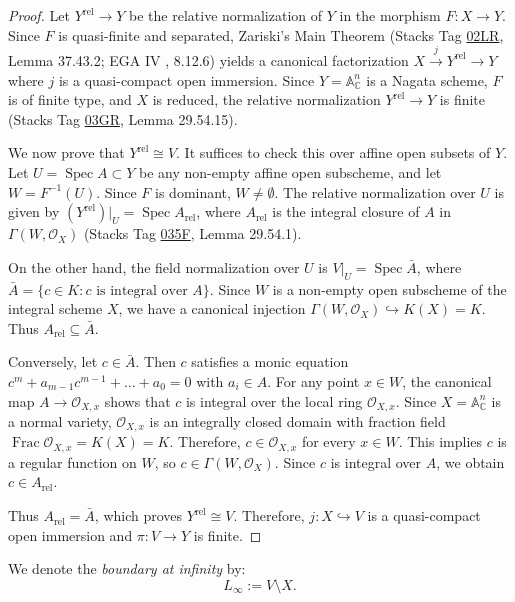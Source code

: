 \documentclass[11pt,reqno]{amsart}
\theoremstyle{plain}
\theoremstyle{definition}
\numberwithin{equation}{section}
\DeclareMathOperator{\Spec}{Spec}
\DeclareMathOperator{\Frac}{Frac}
\newcommand{\A}{\mathbb{A}}
\newcommand{\C}{\mathbb{C}}
\newcommand{\cO}{\mathcal{O}}
\begin{document}
\begin{proof}
Let $Y^{\mathrm{rel}} \to Y$ be the relative normalization of $Y$ in the morphism $F: X \to Y$. Since $F$ is quasi-finite and separated, Zariski's Main Theorem (Stacks Tag \href{https://stacks.math.columbia.edu/tag/02LR}{02LR}, Lemma 37.43.2; EGA IV \cite{EGA4}, 8.12.6) yields a canonical factorization $X \xrightarrow{j} Y^{\mathrm{rel}} \to Y$ where $j$ is a quasi-compact open immersion. Since $Y = \A^n_\C$ is a Nagata scheme, $F$ is of finite type, and $X$ is reduced, the relative normalization $Y^{\mathrm{rel}} \to Y$ is finite (Stacks Tag \href{https://stacks.math.columbia.edu/tag/03GR}{03GR}, Lemma 29.54.15).

We now prove that $Y^{\mathrm{rel}} \cong V$. It suffices to check this over affine open subsets of $Y$.
Let $U = \Spec A \subset Y$ be any non-empty affine open subscheme, and let $W = F^{-1}(U)$. Since $F$ is dominant, $W \neq \emptyset$.
The relative normalization over $U$ is given by $(Y^{\mathrm{rel}})|_U = \Spec A_{\mathrm{rel}}$, where $A_{\mathrm{rel}}$ is the integral closure of $A$ in $\Gamma(W, \cO_X)$ (Stacks Tag \href{https://stacks.math.columbia.edu/tag/035F}{035F}, Lemma 29.54.1).

On the other hand, the field normalization over $U$ is $V|_U = \Spec \bar{A}$, where $\bar{A} = \{ c \in K : c \text{ is integral over } A\}$.
Since $W$ is a non-empty open subscheme of the integral scheme $X$, we have a canonical injection $\Gamma(W, \cO_X) \hookrightarrow K(X) = K$. Thus $A_{\mathrm{rel}} \subseteq \bar{A}$.

Conversely, let $c \in \bar{A}$. Then $c$ satisfies a monic equation $c^m + a_{m-1}c^{m-1} + \dots + a_0 = 0$ with $a_i \in A$.
For any point $x \in W$, the canonical map $A \to \cO_{X,x}$ shows that $c$ is integral over the local ring $\cO_{X,x}$.
Since $X = \A^n_\C$ is a normal variety, $\cO_{X,x}$ is an integrally closed domain with fraction field $\Frac \cO_{X,x} = K(X) = K$.
Therefore, $c \in \cO_{X,x}$ for every $x \in W$.
This implies $c$ is a regular function on $W$, so $c \in \Gamma(W, \cO_X)$. Since $c$ is integral over $A$, we obtain $c \in A_{\mathrm{rel}}$.

Thus $A_{\mathrm{rel}} = \bar{A}$, which proves $Y^{\mathrm{rel}} \cong V$. Therefore, $j: X \hookrightarrow V$ is a quasi-compact open immersion and $\pi: V \to Y$ is finite.
\end{proof}

We denote the \emph{boundary at infinity} by:
\[
L_\infty := V \setminus X.
\]
\end{document}
